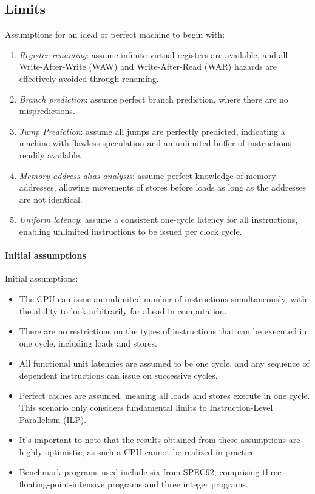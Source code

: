 \subsection{Limits}
Assumptions for an ideal or perfect machine to begin with:
\begin{enumerate}
    \item \textit{Register renaming}: assume infinite virtual registers are available, and all Write-After-Write (WAW) and Write-After-Read (WAR) hazards are effectively avoided through renaming.
    \item \textit{Branch prediction}: assume perfect branch prediction, where there are no mispredictions.
    \item \textit{Jump Prediction}: assume all jumps are perfectly predicted, indicating a machine with flawless speculation and an unlimited buffer of instructions readily available.
    \item \textit{Memory-address alias analysis}: assume perfect knowledge of memory addresses, allowing movements of stores before loads as long as the addresses are not identical.
    \item \textit{Uniform latency}: assume a consistent one-cycle latency for all instructions, enabling unlimited instructions to be issued per clock cycle.
\end{enumerate}

\paragraph*{Initial assumptions}
Initial assumptions:
\begin{itemize}
    \item The CPU can issue an unlimited number of instructions simultaneously, with the ability to look arbitrarily far ahead in computation.
    \item There are no restrictions on the types of instructions that can be executed in one cycle, including loads and stores.
    \item All functional unit latencies are assumed to be one cycle, and any sequence of dependent instructions can issue on successive cycles.
    \item Perfect caches are assumed, meaning all loads and stores execute in one cycle. This scenario only considers fundamental limits to Instruction-Level Parallelism (ILP).
    \item It's important to note that the results obtained from these assumptions are highly optimistic, as such a CPU cannot be realized in practice.
    \item Benchmark programs used include six from SPEC92, comprising three floating-point-intensive programs and three integer programs.
\end{itemize}

